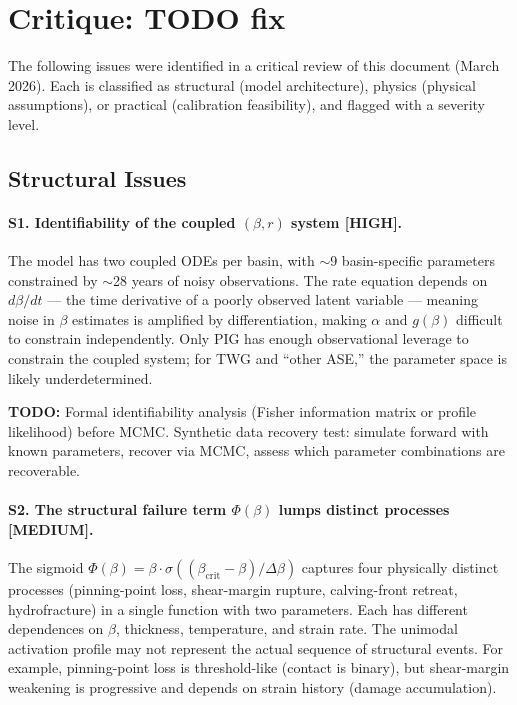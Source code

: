 \documentclass[11pt]{article}
\theoremstyle{definition}
\begin{document}
\section{Critique: TODO fix}
\label{sec:critique}

The following issues were identified in a critical review of this document (March 2026).  Each is classified as structural (model architecture), physics (physical assumptions), or practical (calibration feasibility), and flagged with a severity level.

\subsection{Structural Issues}

\paragraph{S1. Identifiability of the coupled $(\beta, r)$ system [HIGH].}
The model has two coupled ODEs per basin, with $\sim$9 basin-specific parameters constrained by $\sim$28 years of noisy observations.  The rate equation depends on $d\beta/dt$ --- the time derivative of a poorly observed latent variable --- meaning noise in $\beta$ estimates is amplified by differentiation, making $\alpha$ and $g(\beta)$ difficult to constrain independently.  Only PIG has enough observational leverage to constrain the coupled system; for TWG and ``other ASE,'' the parameter space is likely underdetermined.

\textbf{TODO:} Formal identifiability analysis (Fisher information matrix or profile likelihood) before MCMC.  Synthetic data recovery test: simulate forward with known parameters, recover via MCMC, assess which parameter combinations are recoverable.

\paragraph{S2. The structural failure term $\Phi(\beta)$ lumps distinct processes [MEDIUM].}
The sigmoid $\Phi(\beta) = \beta \cdot \sigma((\beta_{\text{crit}} - \beta)/\Delta\beta)$ captures four physically distinct processes (pinning-point loss, shear-margin rupture, calving-front retreat, hydrofracture) in a single function with two parameters.  Each has different dependences on $\beta$, thickness, temperature, and strain rate.  The unimodal activation profile may not represent the actual sequence of structural events.  For example, pinning-point loss is threshold-like (contact is binary), but shear-margin weakening is progressive and depends on strain history (damage accumulation).
\end{document}
